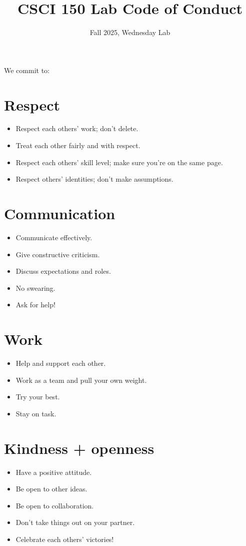 \documentclass{tufte-handout}
\title{CSCI 150 Lab Code of Conduct}
\date{Fall 2025, Wednesday Lab}
\begin{document}
\maketitle

We commit to:

\section{Respect}
\begin{itemize}
\item Respect each others' work; don't delete.
\item Treat each other fairly and with respect.
\item Respect each others' skill level; make sure you're on the same
  page.
\item Respect others' identities; don't make assumptions.
\end{itemize}

\section{Communication}
\begin{itemize}
\item Communicate effectively.
\item Give constructive criticism.
\item Discuss expectations and roles.
\item No swearing.
\item Ask for help!
\end{itemize}

\section{Work}
\begin{itemize}
\item Help and support each other.
\item Work as a team and pull your own weight.
\item Try your best.
\item Stay on task.
\end{itemize}

\section{Kindness + openness}
\begin{itemize}
\item Have a positive attitude.
\item Be open to other ideas.
\item Be open to collaboration.
\item Don't take things out on your partner.
\item Celebrate each others' victories!
\end{itemize}
\end{document}
